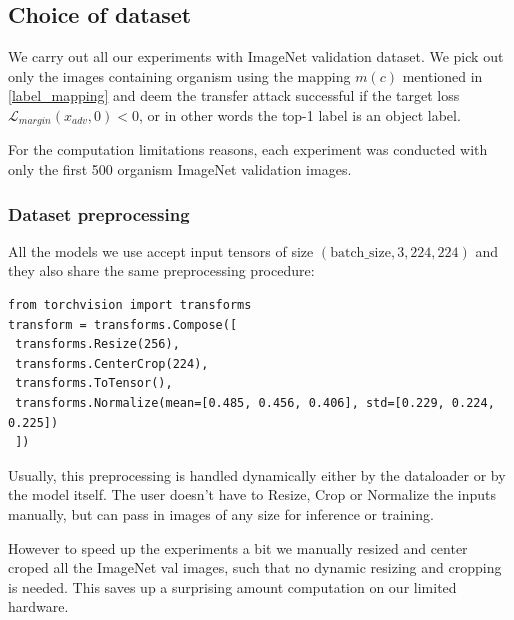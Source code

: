 \subsection{Choice of dataset}
We carry out all our experiments with ImageNet validation dataset. We pick out only the images containing organism using the mapping $m(c)$ mentioned in \ref{label_mapping} and deem the transfer attack successful if the target loss $\mathcal{L}_{margin}(x_{adv}, 0) < 0$, or in other words the top-1 label is an object label.

For the computation limitations reasons, each experiment was conducted with only the first 500 organism ImageNet validation images.

\subsubsection{Dataset preprocessing}
\label{dataset_preprocessing}
All the models we use accept input tensors of size $(\text{batch\_size}, 3, 224, 224)$ and they also share the same preprocessing procedure:
\begin{verbatim}
from torchvision import transforms
transform = transforms.Compose([
 transforms.Resize(256),
 transforms.CenterCrop(224),
 transforms.ToTensor(),
 transforms.Normalize(mean=[0.485, 0.456, 0.406], std=[0.229, 0.224, 0.225])
 ])
\end{verbatim}

Usually, this preprocessing is handled dynamically either by the dataloader or by the model itself. The user doesn't have to Resize, Crop or Normalize the inputs manually, but can pass in images of any size for inference or training.

However to speed up the experiments a bit we manually resized and center croped all the ImageNet val images, such that no dynamic resizing and cropping is needed. This saves up a surprising amount computation on our limited hardware.


